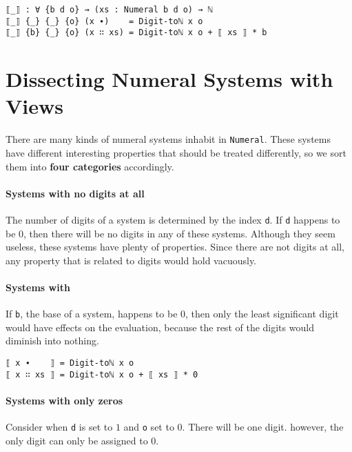 \documentclass[\main/thesis.tex]{subfiles}
\begin{document}
\begin{lstlisting}
⟦_⟧ : ∀ {b d o} → (xs : Numeral b d o) → ℕ
⟦_⟧ {_} {_} {o} (x ∙)    = Digit-toℕ x o
⟦_⟧ {b} {_} {o} (x ∷ xs) = Digit-toℕ x o + ⟦ xs ⟧ * b
\end{lstlisting}

\section{Dissecting Numeral Systems with Views}\label{views}

There are many kinds of numeral systems inhabit in {\lstinline|Numeral|}.
These systems have different interesting properties that should be treated
differently, so we sort them into \textbf{four categories} accordingly.

\paragraph{Systems with no digits at all}

The number of digits of a system is determined by the index {\lstinline|d|}.
If {\lstinline|d|} happens to be $ 0 $, then there will be no digits in any of
these systems. Although they seem useless, these systems have plenty of properties.
Since there are not digits at all, any property that is related to digits would
hold vacuously.

\paragraph{Systems with }

If {\lstinline|b|}, the base of a system, happens to be $ 0 $,
then only the least significant digit would have effects on the evaluation,
because the rest of the digits would diminish into nothing.

\begin{lstlisting}
⟦ x ∙    ⟧ = Digit-toℕ x o
⟦ x ∷ xs ⟧ = Digit-toℕ x o + ⟦ xs ⟧ * 0
\end{lstlisting}

\paragraph{Systems with only zeros}

Consider when {\lstinline|d|} is set to $ 1 $ and {\lstinline|o|} set to $ 0 $.
There will be one digit. however, the only digit can only be assigned to $ 0 $.
\end{document}
